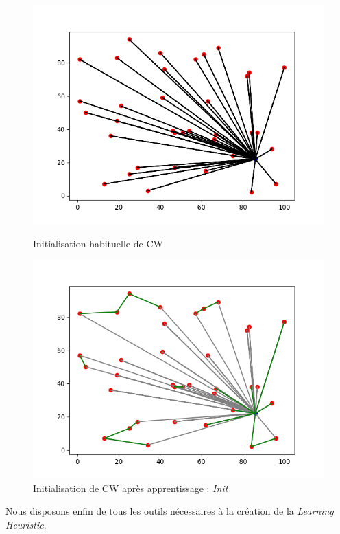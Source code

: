 \documentclass[a4paper,11pt]{article}%
\begin{document}
\begin{figure}[h!]
    \begin{minipage}[c]{.46\linewidth}
        \centering
        \includegraphics[scale=0.4]{CWinit.png}
        \caption{Initialisation habituelle de CW}
    \end{minipage}
    \hfill%
    \begin{minipage}[c]{.46\linewidth}
        \centering
        \includegraphics[scale=0.4]{learning.png}
        \caption{Initialisation de CW après apprentissage : \emph{Init}}
        \label{newInit}
    \end{minipage}
\end{figure}

Nous disposons enfin de tous les outils nécessaires à la création de la \emph{Learning Heuristic}.
\end{document}
